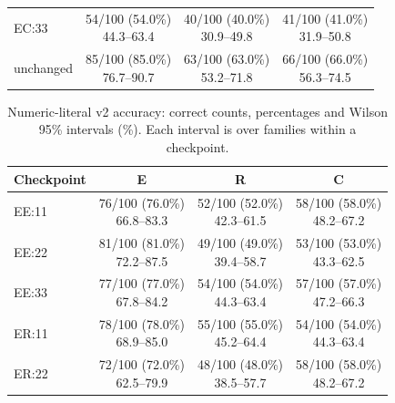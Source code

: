 \begin{table}[H]
\begin{tabular}{@{}lccc@{}}
EC:33 & \makecell{54/100 (54.0\%)\\44.3--63.4} & \makecell{40/100 (40.0\%)\\30.9--49.8} & \makecell{41/100 (41.0\%)\\31.9--50.8}\\
unchanged & \makecell{85/100 (85.0\%)\\76.7--90.7} & \makecell{63/100 (63.0\%)\\53.2--71.8} & \makecell{66/100 (66.0\%)\\56.3--74.5}\\
\bottomrule
\end{tabular}
\end{table}

\begin{table}[H]
\centering\small\singlespacing
\caption{Numeric-literal v2 accuracy: correct counts, percentages and Wilson 95\% intervals (\%). Each interval is over families within a checkpoint.}
\label{tab:phase2-numeric-accuracy}
\begin{tabular}{@{}lccc@{}}
\toprule
Checkpoint & E & R & C\\
\midrule
EE:11 & \makecell{76/100 (76.0\%)\\66.8--83.3} & \makecell{52/100 (52.0\%)\\42.3--61.5} & \makecell{58/100 (58.0\%)\\48.2--67.2}\\
EE:22 & \makecell{81/100 (81.0\%)\\72.2--87.5} & \makecell{49/100 (49.0\%)\\39.4--58.7} & \makecell{53/100 (53.0\%)\\43.3--62.5}\\
EE:33 & \makecell{77/100 (77.0\%)\\67.8--84.2} & \makecell{54/100 (54.0\%)\\44.3--63.4} & \makecell{57/100 (57.0\%)\\47.2--66.3}\\
ER:11 & \makecell{78/100 (78.0\%)\\68.9--85.0} & \makecell{55/100 (55.0\%)\\45.2--64.4} & \makecell{54/100 (54.0\%)\\44.3--63.4}\\
ER:22 & \makecell{72/100 (72.0\%)\\62.5--79.9} & \makecell{48/100 (48.0\%)\\38.5--57.7} & \makecell{58/100 (58.0\%)\\48.2--67.2}\\

\end{tabular}
\end{table}
